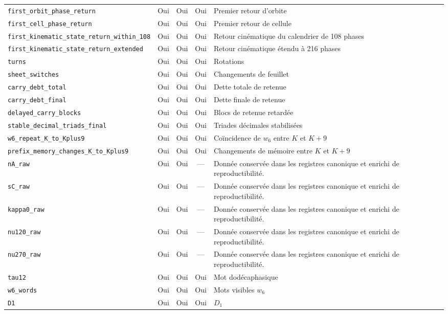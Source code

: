 \begin{longtable}{p{}ccc p{}}
\nolinkurl{first_orbit_phase_return} & Oui & Oui & Oui & Premier retour d'orbite \\
\nolinkurl{first_cell_phase_return} & Oui & Oui & Oui & Premier retour de cellule \\
\nolinkurl{first_kinematic_state_return_within_108} & Oui & Oui & Oui & Retour cinématique du calendrier de 108 phases \\
\nolinkurl{first_kinematic_state_return_extended} & Oui & Oui & Oui & Retour cinématique étendu à 216 phases \\
\nolinkurl{turns} & Oui & Oui & Oui & Rotations \\
\nolinkurl{sheet_switches} & Oui & Oui & Oui & Changements de feuillet \\
\nolinkurl{carry_debt_total} & Oui & Oui & Oui & Dette totale de retenue \\
\nolinkurl{carry_debt_final} & Oui & Oui & Oui & Dette finale de retenue \\
\nolinkurl{delayed_carry_blocks} & Oui & Oui & Oui & Blocs de retenue retardée \\
\nolinkurl{stable_decimal_triads_final} & Oui & Oui & Oui & Triades décimales stabilisées \\
\nolinkurl{w6_repeat_K_to_Kplus9} & Oui & Oui & Oui & Coïncidence de \(w_6\) entre \(K\) et \(K+9\) \\
\nolinkurl{prefix_memory_changes_K_to_Kplus9} & Oui & Oui & Oui & Changements de mémoire entre \(K\) et \(K+9\) \\
\nolinkurl{nA_raw} & Oui & Oui & --- & Donnée conservée dans les registres canonique et enrichi de reproductibilité. \\
\nolinkurl{sC_raw} & Oui & Oui & --- & Donnée conservée dans les registres canonique et enrichi de reproductibilité. \\
\nolinkurl{kappa0_raw} & Oui & Oui & --- & Donnée conservée dans les registres canonique et enrichi de reproductibilité. \\
\nolinkurl{nu120_raw} & Oui & Oui & --- & Donnée conservée dans les registres canonique et enrichi de reproductibilité. \\
\nolinkurl{nu270_raw} & Oui & Oui & --- & Donnée conservée dans les registres canonique et enrichi de reproductibilité. \\
\nolinkurl{tau12} & Oui & Oui & Oui & Mot dodécaphasique \\
\nolinkurl{w6_words} & Oui & Oui & Oui & Mots visibles \(w_6\) \\
\nolinkurl{D1} & Oui & Oui & Oui & \(D_1\) \\

\end{longtable}
